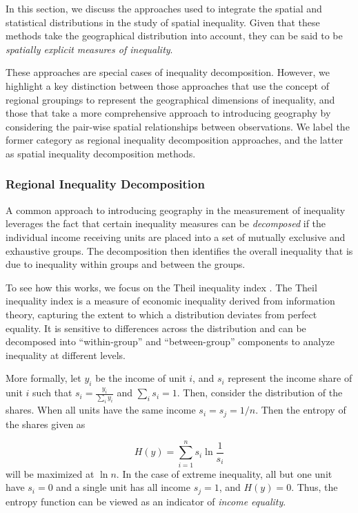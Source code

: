 \documentclass[
  a4paper, 
  twoside,
  final
]{article}
\begin{document}
In this section, we discuss the approaches used to integrate the spatial
and statistical distributions in the study of spatial inequality. Given
that these methods take the geographical distribution into account, they
can be said to be \emph{spatially explicit measures of inequality}.

These approaches are special cases of inequality decomposition. However,
we highlight a key distinction between those approaches that use the
concept of regional groupings to represent the geographical dimensions
of inequality, and those that take a more comprehensive approach to
introducing geography by considering the pair-wise spatial relationships
between observations. We label the former category as regional
inequality decomposition approaches, and the latter as spatial
inequality decomposition methods.

\subsubsection{Regional Inequality
Decomposition}\label{regional-inequality-decomposition}

A common approach to introducing geography in the measurement of
inequality leverages the fact that certain inequality measures can be
\emph{decomposed} if the individual income receiving units are placed
into a set of mutually exclusive and exhaustive groups. The
decomposition then identifies the overall inequality that is due to
inequality within groups and between the groups.

To see how this works, we focus on the Theil inequality index
\citep{theil1967EconomicsInformation}. The Theil inequality index is a
measure of economic inequality derived from information theory,
capturing the extent to which a distribution deviates from perfect
equality. It is sensitive to differences across the distribution and can
be decomposed into ``within-group'' and ``between-group'' components to
analyze inequality at different levels.

More formally, let \(y_i\) be the income of unit \(i\), and \(s_i\)
represent the income share of unit \(i\) such that
\(s_i = \frac{y_i}{\sum_i y_i}\) and \(\sum_i s_i=1\). Then, consider
the distribution of the shares. When all units have the same income
\(s_i = s_j =
1/n\). Then the entropy of the shares given as

\[ H(y) = \sum_{i=1}^n s_i \ln \frac{1}{s_i}\] will be maximized at
\(\ln n\). In the case of extreme inequality, all but one unit have
\(s_i=0\) and a single unit has all income \(s_j=1\), and \(H(y)=0\).
Thus, the entropy function can be viewed as an indicator of \emph{income
equality}.
\end{document}

